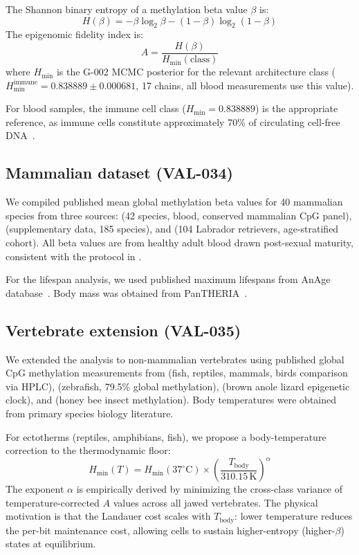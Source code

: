 \documentclass[11pt,a4paper]{article}
\newcommand{\Hmin}{H_{\min}}
\newcommand{\Ascore}{A}
\newcommand{\Tbody}{T_{\mathrm{body}}}
\begin{document}
The Shannon binary entropy of a methylation beta value $\beta$ is:
\begin{equation}
H(\beta) = -\beta\log_2\beta - (1-\beta)\log_2(1-\beta)
\end{equation}
The epigenomic fidelity index is:
\begin{equation}
\Ascore = \frac{H(\beta)}{\Hmin(\text{class})}
\end{equation}
where $\Hmin$ is the G-002 MCMC posterior for the relevant architecture class
($\Hmin^{\mathrm{immune}} = 0.838889 \pm 0.000681$, 17 chains, all blood
measurements use this value).

For blood samples, the immune cell class ($\Hmin = 0.838889$) is the appropriate
reference, as immune cells constitute approximately 70\% of circulating
cell-free DNA~\citep{Moss2018}.

\subsection{Mammalian dataset (VAL-034)}

We compiled published mean global methylation beta values for 40 mammalian
species from three sources: \citet{Lowe2018} (42 species, blood, conserved
mammalian CpG panel), \citet{Lu2023} (supplementary data, 185 species),
and \citet{Wang2020} (104 Labrador retrievers, age-stratified cohort).
All beta values are from healthy adult blood drawn post-sexual maturity,
consistent with the protocol in \citet{Lu2023}.

For the lifespan analysis, we used published maximum lifespans from
AnAge database~\citep{Tacutu2018}. Body mass was obtained from PanTHERIA~\citep{Jones2009}.

\subsection{Vertebrate extension (VAL-035)}

We extended the analysis to non-mammalian vertebrates using published global
CpG methylation measurements from \citet{Varriale2006_fish,Varriale2006_reptile}
(fish, reptiles, mammals, birds comparison via HPLC), \citet{Feng2010} (zebrafish,
79.5\% global methylation), \citet{Bertucci2021} (brown anole lizard epigenetic clock),
and \citet{Lyko2018} (honey bee insect methylation). Body temperatures were
obtained from primary species biology literature.

For ectotherms (reptiles, amphibians, fish), we propose a body-temperature
correction to the thermodynamic floor:
\begin{equation}
\Hmin(T) = \Hmin(37^\circ\mathrm{C}) \times \left(\frac{T_{\mathrm{body}}}{310.15\,\mathrm{K}}\right)^\alpha
\label{eq:Tcorr}
\end{equation}
The exponent $\alpha$ is empirically derived by minimizing the cross-class
variance of temperature-corrected $\Ascore$ values across all jawed vertebrates.
The physical motivation is that the Landauer cost scales with $\Tbody$:
lower temperature reduces the per-bit maintenance cost, allowing cells
to sustain higher-entropy (higher-$\beta$) states at equilibrium.
\end{document}
